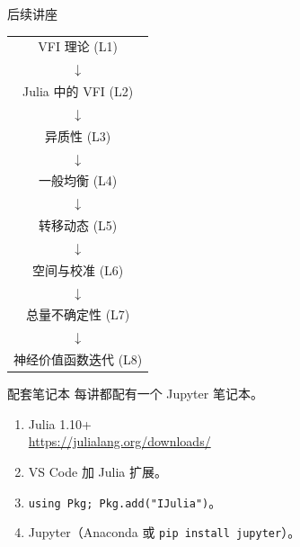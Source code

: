 \documentclass[10pt,aspectratio=169]{beamer}
\begin{document}
\begin{frame}{后续讲座}
\centering
\footnotesize
\setlength{\tabcolsep}{4pt}
\renewcommand{\arraystretch}{0.9}
\begin{tabular}{c}
VFI 理论 \quad (L1) \\
$\downarrow$ \\
Julia 中的 VFI \quad (L2) \\
$\downarrow$ \\
异质性 \quad (L3) \\
$\downarrow$ \\
一般均衡 \quad (L4) \\
$\downarrow$ \\
转移动态 \quad (L5) \\
$\downarrow$ \\
空间与校准 \quad (L6) \\
$\downarrow$ \\
总量不确定性 \quad (L7) \\
$\downarrow$ \\
\alert{神经价值函数迭代} \quad (L8)
\end{tabular}
\end{frame}

\begin{frame}{配套笔记本}
  每讲都配有一个 Jupyter 笔记本。
  \begin{enumerate}
    \item Julia 1.10+\\
      \footnotesize\url{https://julialang.org/downloads/}
    \item \normalsize VS Code 加 Julia 扩展。
    \item \texttt{using Pkg; Pkg.add("IJulia")}。
    \item Jupyter（Anaconda 或 \texttt{pip install jupyter}）。
  \end{enumerate}
\end{frame}
\end{document}
